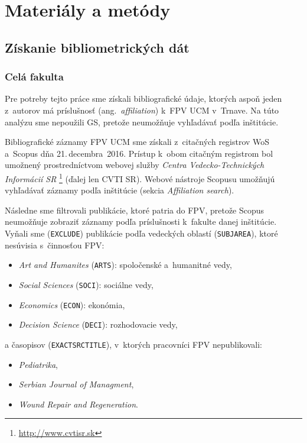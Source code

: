 \chapter{Materiály a metódy}
\label{chap:methods}

\section{Získanie bibliometrických dát}

\subsection{Celá fakulta}
\label{sec.all.mining}

Pre potreby tejto práce sme získali bibliografické údaje, ktorých aspoň jeden
z~autorov má príslušnosť (ang.~\emph{affiliation}) k~FPV UCM v~Trnave.  Na túto
analýzu sme nepoužili GS, pretože neumožňuje vyhľadávať podľa inštitúcie.

Bibliografické záznamy FPV UCM sme získali z~citačných registrov WoS a~Scopus
dňa 21.\,decembra~2016.  Prístup k~obom citačným registrom bol umožnený
prostredníctvom webovej služby \emph{Centra Vedecko-Technických Informácií SR}%
\footnote{\url{http://www.cvtisr.sk}} (ďalej len CVTI SR).  Webové nástroje
Scopusu umožňujú vyhľadávať záznamy podľa inštitúcie (sekcia \emph{Affiliation
  search}).

Následne sme filtrovali publikácie, ktoré patria do FPV, pretože Scopus
neumožňuje zobraziť záznamy podľa príslušnosti k~fakulte danej inštitúcie.
Vyňali sme (\texttt{EXCLUDE}) publikácie podľa vedeckých oblastí
(\texttt{SUBJAREA}), ktoré nesúvisia s~činnosťou FPV:

\begin{itemize}
\item \emph{Art and Humanites} (\texttt{ARTS}): spoločenské a~humanitné vedy,
\item \emph{Social Sciences} (\texttt{SOCI}): sociálne vedy,
\item \emph{Economics} (\texttt{ECON}): ekonómia,
\item \emph{Decision Science} (\texttt{DECI}): rozhodovacie vedy,
\end{itemize}
a časopisov (\texttt{EXACTSRCTITLE}), v~ktorých pracovníci FPV nepublikovali:

\begin{itemize}
\item \emph{Pediatrika},
\item \emph{Serbian Journal of Managment},
\item \emph{Wound Repair and Regeneration}.
\end{itemize}

